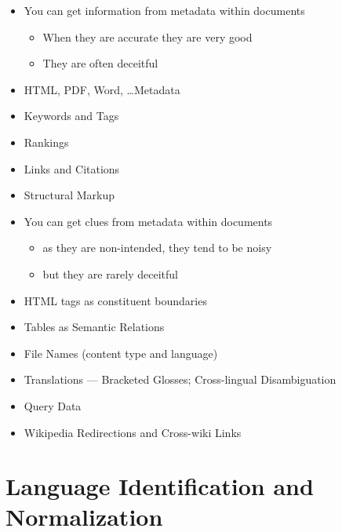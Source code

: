 \documentclass[a4paper,landscape,headrule,footrule,xetex]{foils}
\begin{document}
\MyLogo{}
\begin{itemize}
\item You can get information from metadata within documents
  \begin{itemize}
  \item When they are accurate they are very good
  \item They are often deceitful
  \end{itemize}
\item HTML, PDF, Word, \ldots Metadata
\item Keywords and Tags
\item Rankings
\item Links and Citations
\item Structural Markup
\end{itemize}

\begin{itemize}
\item You can get clues from metadata within documents
  \begin{itemize}
  \item as they are non-intended, they tend to be noisy
  \item but they are rarely deceitful
  \end{itemize}
\item HTML tags as constituent boundaries
\item Tables as Semantic Relations
\item File Names (content type and language)
\item Translations ---  Bracketed Glosses;  Cross-lingual Disambiguation
\item Query Data
\item Wikipedia Redirections and Cross-wiki Links
\end{itemize}

\section{Language Identification and Normalization}

\end{document}
